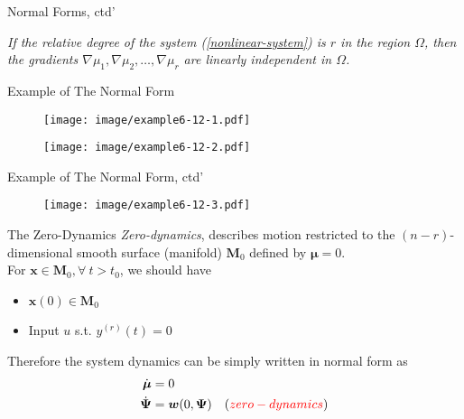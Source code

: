 \documentclass{beamer}
\renewcommand{\vec}[1]{\ensuremath{\boldsymbol{#1}}} %
\begin{document}
\begin{frame}{Normal Forms, ctd'}
    \begin{lemma}[6.5]
    \textit{
    If the relative degree of the system (\ref{nonlinear-system}) is $r$ in the region $\Omega$, then the gradients $\nabla \mu_{1}, \nabla \mu_{2}, \dots, \nabla \mu_{r}$ are linearly independent in $\Omega$.
    }
    \end{lemma}
\end{frame}

\begin{frame}{Example of The Normal Form}
    \begin{figure}
      \centering
      \texttt{[image: image/example6-12-1.pdf]}
    \end{figure}
    \vspace{-20pt}
    \begin{figure}
      \centering
      \texttt{[image: image/example6-12-2.pdf]}
    \end{figure}
\end{frame}

\begin{frame}{Example of The Normal Form, ctd'}
    \begin{figure}
      \centering
      \texttt{[image: image/example6-12-3.pdf]}
    \end{figure}
\end{frame}


\begin{frame}{The Zero-Dynamics}
    \textit{Zero-dynamics}, describes motion restricted to the $(n-r)$- dimensional smooth surface {\color{red}(manifold) $\vec{M}_{0}$} defined by {\color{red}$\vec{\mu}=0$}.
    \\
    For $\vec{x} \in \vec{M}_{0}, \forall~t>t_{0}$, we should have
    \begin{itemize}
      \item $\vec{x}(0) \in \vec{M}_{0}$
      \item Input $u$ s.t. $y^{(r)}(t)=0$
    \end{itemize}
    Therefore the system dynamics can be simply written in normal form as
    \begin{equation}\label{zero-normal-form}
      \begin{aligned}
        \dot{\vec{\mu}} &= 0 \\
        \dot{\vec{\Psi}}&= \vec{w}(0, \vec{\Psi})\quad ({\color{red}zero-dynamics})
      \end{aligned}
    \end{equation}
\end{frame}
\end{document}
